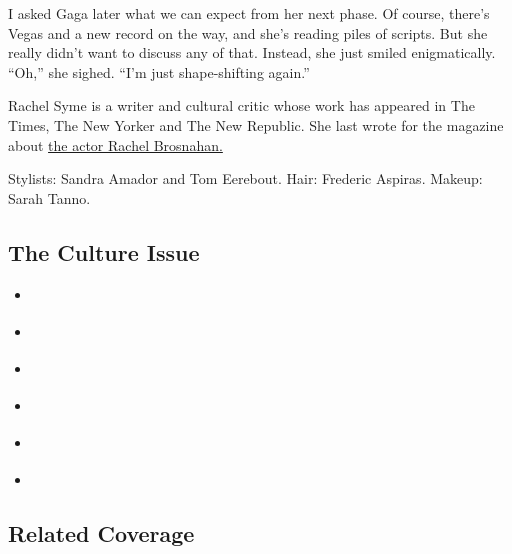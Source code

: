 I asked Gaga later what we can expect from her next phase. Of course,
there's Vegas and a new record on the way, and she's reading piles of
scripts. But she really didn't want to discuss any of that. Instead, she
just smiled enigmatically. ``Oh,'' she sighed. ``I'm just shape-shifting
again.''

Rachel Syme is a writer and cultural critic whose work has appeared in
The Times, The New Yorker and The New Republic. She last wrote for the
magazine about
\href{https://www.nytimes3xbfgragh.onion/2017/11/28/magazine/rachel-brosnahans-comic-timing.html}{the
actor Rachel Brosnahan.}

Stylists: Sandra Amador and Tom Eerebout. Hair: Frederic Aspiras.
Makeup: Sarah Tanno.

\hypertarget{the-culture-issue}{%
\subsection{The Culture Issue}\label{the-culture-issue}}

\begin{itemize}
\tightlist
\item
  \href{https://www.nytimes3xbfgragh.onion/interactive/2018/10/03/magazine/lady-gaga-movie-star-is-born.html}{}
\item
  \href{https://www.nytimes3xbfgragh.onion/interactive/2018/10/03/magazine/morality-social-justice-art-entertainment.html}{}
\item
  \href{https://www.nytimes3xbfgragh.onion/interactive/2018/10/04/magazine/good-place-michael-schur-philosophy.html}{}
\item
  \href{https://www.nytimes3xbfgragh.onion/interactive/2018/10/04/magazine/barry-jenkins-james-baldwin-if-beale-street-could-talk.html}{}
\item
  \href{https://www.nytimes3xbfgragh.onion/interactive/2018/10/05/magazine/instagram-cindy-sherman-ugly-beauty.html}{}
\item
  \href{https://www.nytimes3xbfgragh.onion/interactive/2018/10/05/magazine/culture-moments-2018.html}{}
\end{itemize}

\hypertarget{related-coverage}{%
\subsection{Related Coverage}\label{related-coverage}}

